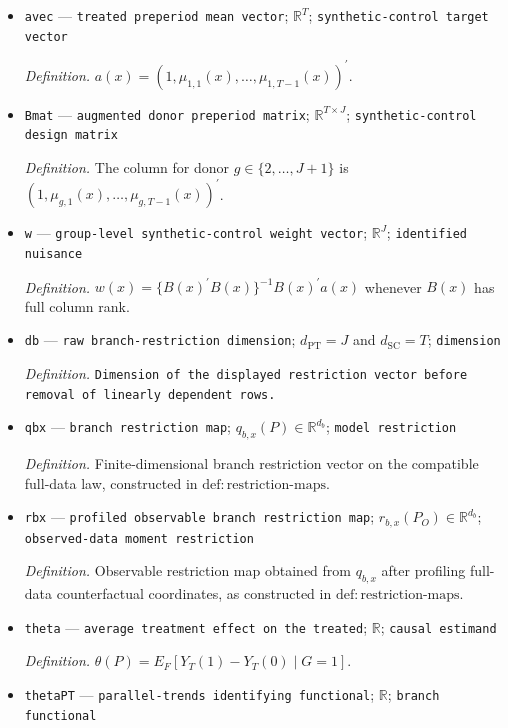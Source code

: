 \documentclass{article}
\begin{document}
\begin{itemize}
  \item \texttt{avec} --- \texttt{treated preperiod mean vector}; \(\mathbb R^T\); \texttt{synthetic-\allowbreak{}control target vector}
  \par\smallskip\noindent\emph{Definition.} \(a(x)=(1,\mu_{1,1}(x),\ldots,\mu_{1,T-1}(x))^{\prime}\).
  \item \texttt{Bmat} --- \texttt{augmented donor preperiod matrix}; \(\mathbb R^{T\times J}\); \texttt{synthetic-\allowbreak{}control design matrix}
  \par\smallskip\noindent\emph{Definition.} The column for donor \(g\in\{2,\ldots,J+1\}\) is \((1,\mu_{g,1}(x),\ldots,\mu_{g,T-1}(x))^{\prime}\).
  \item \texttt{w} --- \texttt{group-\allowbreak{}level synthetic-\allowbreak{}control weight vector}; \(\mathbb R^J\); \texttt{identified nuisance}
  \par\smallskip\noindent\emph{Definition.} \(w(x)=\{B(x)^{\prime}B(x)\}^{-1}B(x)^{\prime}a(x)\) whenever \(B(x)\) has full column rank.
  \item \texttt{db} --- \texttt{raw branch-\allowbreak{}restriction dimension}; \(d_{\mathrm{PT}}=J\) and \(d_{\mathrm{SC}}=T\); \texttt{dimension}
  \par\smallskip\noindent\emph{Definition.} \texttt{Dimension of the displayed restriction vector before removal of linearly dependent rows.}
  \item \texttt{qbx} --- \texttt{branch restriction map}; \(q_{b,x}(P)\in\mathbb R^{d_b}\); \texttt{model restriction}
  \par\smallskip\noindent\emph{Definition.} Finite-dimensional branch restriction vector on the compatible full-data law, constructed in \(\mathrm{def{:}restriction\text{-}maps}\).
  \item \texttt{rbx} --- \texttt{profiled observable branch restriction map}; \(r_{b,x}(P_O)\in\mathbb R^{d_b}\); \texttt{observed-\allowbreak{}data moment restriction}
  \par\smallskip\noindent\emph{Definition.} Observable restriction map obtained from \(q_{b,x}\) after profiling full-data counterfactual coordinates, as constructed in \(\mathrm{def{:}restriction\text{-}maps}\).
  \item \texttt{theta} --- \texttt{average treatment effect on the treated}; \(\mathbb R\); \texttt{causal estimand}
  \par\smallskip\noindent\emph{Definition.} \(\theta(P)=E_F[Y_T(1)-Y_T(0)\mid G=1]\).
  \item \texttt{thetaPT} --- \texttt{parallel-\allowbreak{}trends identifying functional}; \(\mathbb R\); \texttt{branch functional}

\end{itemize}
\end{document}
